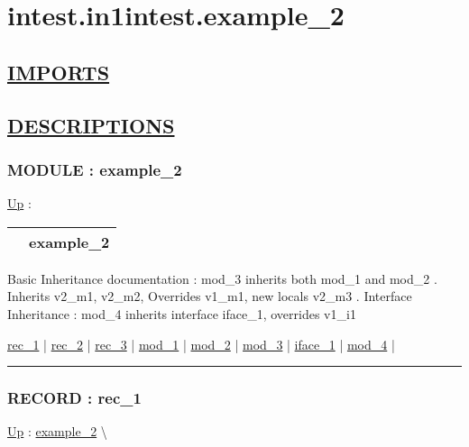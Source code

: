 \chapter*{intest.in1intest.example\_2}
\hypertarget{ecldoc:toc:intest.in1intest.example_2}{}

\section*{\underline{IMPORTS}}

\section*{\underline{DESCRIPTIONS}}
\subsection*{MODULE : example\_2}
\hypertarget{ecldoc:intest.in1intest.example_2}{}
\hyperlink{ecldoc:toc:intest/in1intest}{Up} :

{\renewcommand{\arraystretch}{1.5}
\begin{tabularx}{\textwidth}{|>{\raggedright\arraybackslash}l|X|}
\hline
\hspace{0pt} & example\_2 \\
\hline
\end{tabularx}
}

\par
Basic Inheritance documentation : mod\_3 inherits both mod\_1 and mod\_2 . Inherits v2\_m1, v2\_m2, Overrides v1\_m1, new locals v2\_m3 . Interface Inheritance : mod\_4 inherits interface iface\_1, overrides v1\_i1


\hyperlink{ecldoc:intest.in1intest.example_2.rec_1}{rec\_1}  |
\hyperlink{ecldoc:intest.in1intest.example_2.rec_2}{rec\_2}  |
\hyperlink{ecldoc:intest.in1intest.example_2.rec_3}{rec\_3}  |
\hyperlink{ecldoc:intest.in1intest.example_2.mod_1}{mod\_1}  |
\hyperlink{ecldoc:intest.in1intest.example_2.mod_2}{mod\_2}  |
\hyperlink{ecldoc:intest.in1intest.example_2.mod_3}{mod\_3}  |
\hyperlink{ecldoc:intest.in1intest.example_2.iface_1}{iface\_1}  |
\hyperlink{ecldoc:intest.in1intest.example_2.mod_4}{mod\_4}  |

\rule{\linewidth}{0.5pt}

\subsection*{RECORD : rec\_1}
\hypertarget{ecldoc:intest.in1intest.example_2.rec_1}{}
\hyperlink{ecldoc:intest.in1intest.example_2}{Up} :
\hspace{0pt} \hyperlink{ecldoc:intest.in1intest.example_2}{example_2} \textbackslash 

